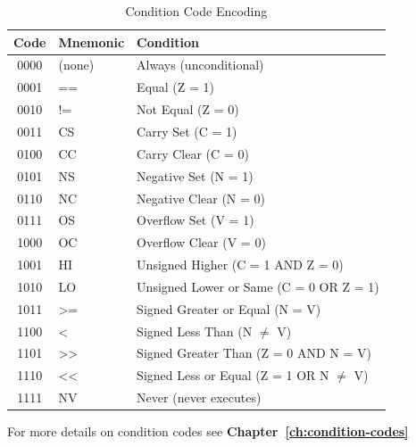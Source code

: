 \begin{table}[H]
	\centering
	\small
	\begin{tabular}{clp{6cm}}
		\toprule
		\textbf{Code} & \textbf{Mnemonic} & \textbf{Condition}                         \\
		\midrule
		0000          & (none)            & Always (unconditional)                     \\
		0001          & ==                & Equal (Z = 1)                              \\
		0010          & !=                & Not Equal (Z = 0)                          \\
		0011          & CS                & Carry Set (C = 1)                          \\
		0100          & CC                & Carry Clear (C = 0)                        \\
		0101          & NS                & Negative Set (N = 1)                       \\
		0110          & NC                & Negative Clear (N = 0)                     \\
		0111          & OS                & Overflow Set (V = 1)                       \\
		1000          & OC                & Overflow Clear (V = 0)                     \\
		1001          & HI                & Unsigned Higher (C = 1 AND Z = 0)          \\
		1010          & LO                & Unsigned Lower or Same (C = 0 OR Z = 1)    \\
		1011          & >=                & Signed Greater or Equal (N = V)            \\
		1100          & <                 & Signed Less Than (N $\neq$ V)              \\
		1101          & >>                & Signed Greater Than (Z = 0 AND N = V)      \\
		1110          & <<                & Signed Less or Equal (Z = 1 OR N $\neq$ V) \\
		1111          & NV                & Never (never executes)                     \\
		\bottomrule
	\end{tabular}
	\caption{Condition Code Encoding}
	\label{tab:condition-code-encoding}
\end{table}

For more details on condition codes see \textbf{Chapter~\ref{ch:condition-codes}}

